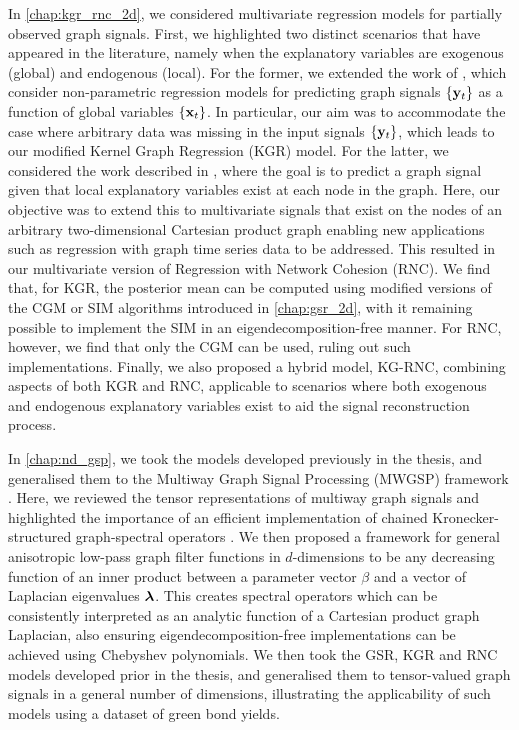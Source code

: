 In \cref{chap:kgr_rnc_2d}, we considered multivariate regression models for partially observed graph signals. First, we highlighted two distinct scenarios that have appeared in the literature, namely when the explanatory variables are exogenous (global) and endogenous (local). For the former, we extended the work of \cite{Venkitaraman2019,Venkitaraman2020}, which consider non-parametric regression models for predicting graph signals $\{\mathbf{y}_t\}$ as a function of global variables $\{\mathbf{x}_t\}$. In particular, our aim was to accommodate the case where arbitrary data was missing in the input signals $\{\mathbf{y}_t\}$, which leads to our modified Kernel Graph Regression (KGR) model. For the latter, we considered the work described in \cite{Li2019}, where the goal is to predict a graph signal given that local explanatory variables exist at each node in the graph. Here, our objective was to extend this to multivariate signals that exist on the nodes of an arbitrary two-dimensional Cartesian product graph enabling new applications such as regression with graph time series data to be addressed. This resulted in our multivariate version of Regression with Network Cohesion (RNC). We find that, for KGR, the posterior mean can be computed using modified versions of the CGM or SIM algorithms introduced in \cref{chap:gsr_2d}, with it remaining possible to implement the SIM in an eigendecomposition-free manner. For RNC, however, we find that only the CGM can be used, ruling out such implementations. Finally, we also proposed a hybrid model, KG-RNC, combining aspects of both KGR and RNC, applicable to scenarios where both exogenous and endogenous explanatory variables exist to aid the signal reconstruction process. 

In \cref{chap:nd_gsp}, we took the models developed previously in the thesis, and generalised them to the Multiway Graph Signal Processing (MWGSP) framework \citep{Stanley2020}. Here, we reviewed the tensor representations of multiway graph signals and highlighted the importance of an efficient implementation of chained Kronecker-structured graph-spectral operators \citep{Antonian2023}. We then proposed a framework for general anisotropic low-pass graph filter functions in $d$-dimensions to be any decreasing function of an inner product between a parameter vector $\beta$ and a vector of Laplacian eigenvalues $\boldsymbol{\lambda}$. This creates spectral operators which can be consistently interpreted as an analytic function of a Cartesian product graph Laplacian, also ensuring eigendecomposition-free implementations can be achieved using Chebyshev polynomials. We then took the GSR, KGR and RNC models developed prior in the thesis, and generalised them to tensor-valued graph signals in a general number of dimensions, illustrating the applicability of such models using a dataset of green bond yields. 


